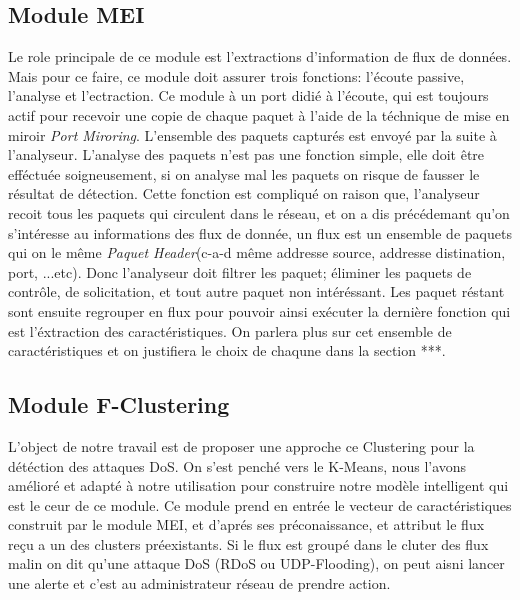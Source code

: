 \newpage
\subsection{Module MEI}
Le role principale de ce module est l'extractions d'information de flux de données. Mais pour ce faire, ce module doit assurer trois fonctions: l'écoute passive, l'analyse et l'ectraction. Ce module à un port didié à l'écoute, qui est toujours actif pour recevoir une copie de chaque paquet à l'aide de la téchnique de mise en miroir \textit{Port Miroring}. L'ensemble des paquets capturés est envoyé par la suite à l'analyseur. L'analyse des paquets n'est pas une fonction simple, elle doit être efféctuée soigneusement, si on analyse mal les paquets on risque de fausser le résultat de détection. Cette fonction est compliqué on raison que, l'analyseur recoit tous les paquets qui circulent dans le réseau, et on a dis précédemant qu'on s'intéresse au informations des flux de donnée, un flux est un ensemble de paquets qui on le même \textit{Paquet Header}(c-a-d même addresse source, addresse distination, port, ...etc). Donc l'analyseur doit filtrer les paquet; éliminer les paquets de contrôle, de solicitation, et tout autre paquet non intéréssant. Les paquet réstant sont ensuite regrouper en flux pour pouvoir ainsi exécuter la dernière fonction qui est l'éxtraction des caractéristiques. On parlera plus sur cet ensemble de caractéristiques et on justifiera le choix de chaqune dans la section ***.

\subsection{Module F-Clustering}
L'object de notre travail est de proposer une approche ce Clustering pour la détéction des attaques DoS. On s'est penché vers le K-Means, nous l'avons amélioré et adapté à notre utilisation pour construire notre modèle intelligent qui est le ceur de ce module. Ce module prend en entrée le vecteur de caractéristiques construit par le module MEI, et d'aprés ses préconaissance, et attribut le flux reçu a un des clusters préexistants. Si le flux est groupé dans le cluter des flux malin on dit qu'une attaque DoS (RDoS ou UDP-Flooding), on peut aisni lancer une alerte et c'est au administrateur réseau de prendre action.

